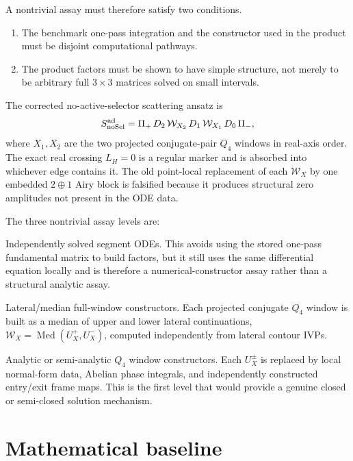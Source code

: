 \documentclass[11pt]{article}
\newcommand{\calW}{\mathcal W}
\newcommand{\Med}{\operatorname{Med}}
\begin{document}
A nontrivial assay must therefore satisfy two conditions.
\begin{enumerate}
  \item The benchmark one-pass integration and the constructor used in the product must be disjoint computational pathways.
  \item The product factors must be shown to have simple structure, not merely to be arbitrary full $3\times 3$ matrices solved on small intervals.
\end{enumerate}

The corrected no-active-selector scattering ansatz is
\begin{equation}
\label{eq:nosel-product}
S^{\rm ad}_{\rm noSel}=\Pi_+\,D_2\,\calW_{X_2}\,D_1\,\calW_{X_1}\,D_0\,\Pi_- ,
\end{equation}
where $X_1,X_2$ are the two projected conjugate-pair $Q_4$ windows in real-axis order. The exact real crossing $L_H=0$ is a regular marker and is absorbed into whichever edge contains it. The old point-local replacement of each $\calW_X$ by one embedded $2\oplus 1$ Airy block is falsified because it produces structural zero amplitudes not present in the ODE data.

The three nontrivial assay levels are:
\begin{description}[leftmargin=2.0em]
  \item[Level 1.] Independently solved segment ODEs. This avoids using the stored one-pass fundamental matrix to build factors, but it still uses the same differential equation locally and is therefore a numerical-constructor assay rather than a structural analytic assay.
  \item[Level 2.] Lateral/median full-window constructors. Each projected conjugate $Q_4$ window is built as a median of upper and lower lateral continuations, $\calW_X=\Med(U_X^+,U_X^-)$, computed independently from lateral contour IVPs.
  \item[Level 3.] Analytic or semi-analytic $Q_4$ window constructors. Each $U_X^\pm$ is replaced by local normal-form data, Abelian phase integrals, and independently constructed entry/exit frame maps. This is the first level that would provide a genuine closed or semi-closed solution mechanism.
\end{description}

\section{Mathematical baseline}
\end{document}
